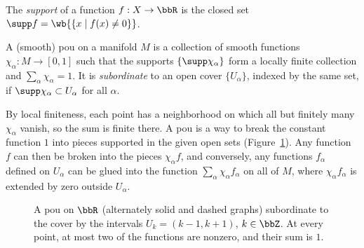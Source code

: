 The \emph{support} of a function $f:X\to\bbR$ is the closed set $\supp f=\wb{\{x\mid f(x)\neq0\}}$.

\begin{defn}
    A (smooth) \gls{pou} on a manifold $M$ is a collection of smooth functions $\chi_\alpha:M\to[0,1]$ such that the supports $\{\supp\chi_\alpha\}$ form a locally finite collection and $\sum_\alpha\chi_\alpha=1$. It is \emph{subordinate} to an open cover $\{U_\alpha\}$, indexed by the same set, if $\supp\chi_\alpha\subset U_\alpha$ for all $\alpha$.
\end{defn}
By local finiteness, each point has a neighborhood on which all but finitely many $\chi_\alpha$ vanish, so the sum is finite there. A \gls{pou} is a way to break the constant function $1$ into pieces supported in the given open sets (Figure~\ref{fig partition of unity}). Any function $f$ can then be broken into the pieces $\chi_\alpha f$, and conversely, any functions $f_\alpha$ defined on $U_\alpha$ can be glued into the function $\sum_\alpha\chi_\alpha f_\alpha$ on all of $M$, where $\chi_\alpha f_\alpha$ is extended by zero outside $U_\alpha$.

\begin{figure}[tp]
    \centering
    \caption{A \gls{pou} on $\bbR$ (alternately solid and dashed graphs) subordinate to the cover by the intervals $U_k=(k-1,k+1)$, $k\in\bbZ$. At every point, at most two of the functions are nonzero, and their sum is $1$.}
    \label{fig partition of unity}
\end{figure}

